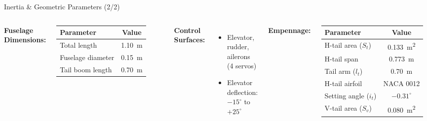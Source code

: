 \documentclass[aspectratio=169,11pt]{beamer}
\begin{document}
\begin{frame}{Inertia \& Geometric Parameters (2/2)}

\begin{columns}[T]

  \textbf{\color{navymain}Fuselage Dimensions:}

  \vspace{0.2cm}
  \begin{tabular}{@{}lc@{}}
    \toprule
    \textbf{Parameter} & \textbf{Value} \\
    \midrule
    Total length          & \SI{1.10}{\meter} \\
    Fuselage diameter     & \SI{0.15}{\meter} \\
    Tail boom length      & \SI{0.70}{\meter} \\
    \bottomrule
  \end{tabular}

  \vspace{0.4cm}
  \textbf{\color{navymain}Control Surfaces:}
  \begin{itemize}\setlength\itemsep{2pt}
    \item Elevator, rudder, ailerons (4 servos)
    \item Elevator deflection: $-15^\circ$ to $+25^\circ$
  \end{itemize}

  \textbf{\color{navymain}Empennage:}

  \vspace{0.2cm}
  \begin{tabular}{@{}lc@{}}
    \toprule
    \textbf{Parameter} & \textbf{Value} \\
    \midrule
    H-tail area ($S_t$)    & \SI{0.133}{\meter\squared} \\
    H-tail span            & \SI{0.773}{\meter} \\
    Tail arm ($l_t$)       & \SI{0.70}{\meter} \\
    H-tail airfoil         & NACA 0012 \\
    Setting angle ($i_t$)  & $-0.31^\circ$ \\
    V-tail area ($S_v$)    & \SI{0.080}{\meter\squared} \\
    \bottomrule
  \end{tabular}

\end{columns}
\end{frame}
\end{document}
